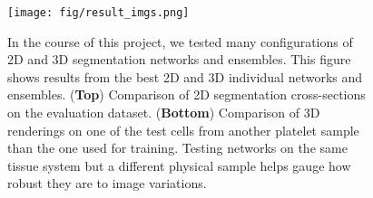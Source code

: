 \documentclass[final]{beamer}
\newlength{\sepwid}
\newlength{\twocolwid}
\renewcommand{\emph}[1]{{\color{nibib2} #1}}
\begin{document}
\begin{frame}[t]
\begin{columns}[t]
\begin{column}{\sepwid}\end{column} %


\begin{column}{\twocolwid}

    \begin{center}
        \begin{figure}
            \texttt{[image: fig/result\_imgs.png]}
            \caption{In the course of this project, we tested many configurations of 2D and 3D segmentation networks and ensembles. This figure shows results from the best 2D and 3D individual networks and ensembles. (\textbf{Top}) Comparison of 2D segmentation cross-sections on the evaluation dataset. (\textbf{Bottom}) Comparison of 3D renderings on one of the test cells from another platelet sample than the one used for training. Testing networks on the same tissue system but a different physical sample helps gauge how robust they are to image variations.}
        \end{figure}
    \end{center}
    
    
    

\end{column}
\end{columns}
\end{frame}
\end{document}
